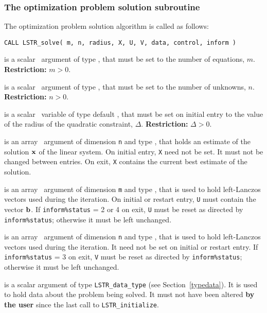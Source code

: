 \documentclass{galahad}
\newcommand{\packagename}{LS\-TR}
\begin{document}

\subsubsection{The optimization problem solution subroutine}
The optimization problem solution algorithm is called as follows:

\hskip0.5in
{\tt CALL \packagename\_solve( m, n, radius, X, U, V, data, control, inform )}

\begin{description}

 is a scalar \intentin\ argument of type \integer, that must be
set to the number of equations, $m$. {\bf Restriction: } $m > 0$.

 is a scalar \intentin\ argument of type \integer, that must be
set to the number of unknowns, $n$. {\bf Restriction: } $n > 0$.

 is a scalar \intentin\ variable of type default
\realdp,
that must be set on initial entry
to the value of the radius of the quadratic constraint, $\Delta$.
{\bf Restriction: } $\Delta > 0$.

 is an array \intentinout\ argument of dimension {\tt n} and
type \realdp,
that holds an estimate of the solution ${\mathbf{x}}$ of the linear system.
On initial entry, {\tt X} need not be set.
It must not be changed between entries.
On exit, {\tt X} contains the current best estimate of the solution.

 is an array \intentinout\ argument of dimension {\tt m} and
type \realdp,
that is used to hold left-Lanczos vectors used during the iteration.
On initial or restart entry, {\tt U} must contain the vector ${\mathbf{b}}$.
If {\tt inform\%status} = 2 or 4 on exit, {\tt U} must be reset
as directed by  {\tt inform\%status}; otherwise
it must be left unchanged.

 is an array \intentinout\ argument of dimension {\tt n} and
type \realdp,
that is used to hold left-Lanczos vectors used during the iteration.
It need not be set on initial or restart entry.
If {\tt inform\%status} = 3 on exit, {\tt V} must be reset
as directed by  {\tt inform\%status}; otherwise it must be left unchanged.

 is a scalar \intentinout argument of type
{\tt \packagename\_data\_type}
(see Section~\ref{typedata}). It is used to hold data about the problem being
solved. It must not have been altered {\bf by the user} since the last call to
{\tt \packagename\_initialize}.


\end{description}
\end{document}
